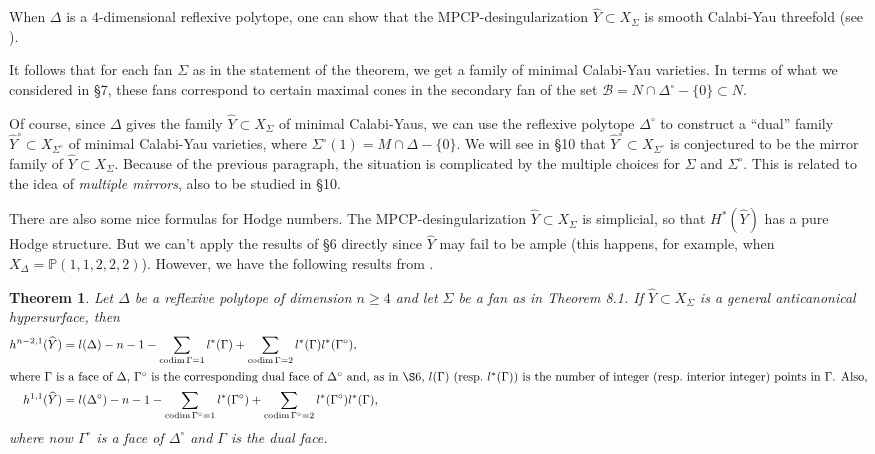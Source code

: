 \documentclass{amsart}
\theoremstyle{plain}
\newtheorem{theorem}{Theorem}[section]
\theoremstyle{definition}
\begin{document}
	When $\Delta$ is a $4$-dimensional reflexive polytope, one can
show that the MPCP-desingularization $\widehat Y \subset X_\Sigma$ is
smooth Calabi-Yau threefold (see \cite{Bat1}).

	It follows that for each fan $\Sigma$ as in the statement of
the theorem, we get a family of minimal Calabi-Yau varieties.  In
terms of what we considered in \S7, these fans correspond to certain
maximal cones in the secondary fan of the set $\mathcal{B} =
N\cap\Delta^\circ-\{0\} \subset N$.  

	Of course, since $\Delta$ gives the family $\widehat Y
\subset X_\Sigma$ of minimal Calabi-Yaus, we can use the reflexive
polytope $\Delta^\circ$ to construct a ``dual'' family $\widehat
Y^\circ \subset X_{\Sigma^\circ}$ of minimal Calabi-Yau varieties,
where $\Sigma^\circ(1) = M\cap\Delta-\{0\}$.  We will see in \S10 that
$\widehat Y^\circ \subset X_{\Sigma^\circ}$ is conjectured to be the
mirror family of $\widehat Y \subset X_\Sigma$.  Because of the
previous paragraph, the situation is complicated by the multiple
choices for $\Sigma$ and $\Sigma^\circ$.  This is related to the idea
of {\it multiple mirrors\/}, also to be studied in \S10.

	There are also some nice formulas for Hodge numbers.  The
MPCP-desingular\-iza\-tion $\widehat Y \subset X_\Sigma$ is
simplicial, so that $H^*(\widehat Y)$ has a pure Hodge structure.  But
we can't apply the results of \S6 directly since $\widehat Y$ may fail
to be ample (this happens, for example, when $X_\Delta = \mathbb{P}(1,1,2,2,2)$).  However, we have the following results from
\cite{Bat1}.

\begin{theorem} Let $\Delta$ be a reflexive polytope of
dimension $n \ge 4$ and let $\Sigma$ be a fan as in Theorem 8.1.  If
$\widehat Y \subset X_\Sigma$ is a general anticanonical hypersurface,
then
\begin{align*}
h^{n-2,1}(\widehat Y) &= l(\Delta) - n - 1 -
   \sum_{\mathrm{codim}\,\Gamma = 1} l^*(\Gamma) +  
   \sum_{\mathrm{codim}\,\Gamma = 2} l^*(\Gamma) l^*(\Gamma^\circ),\\
\intertext{where $\Gamma$ is a face of $\Delta$, $\Gamma^\circ$ is the
corresponding dual face of $\Delta^\circ$ and, as in \S6, $l(\Gamma)$
(resp.\ $l^*(\Gamma)$) is the number of integer (resp.\ interior
integer) points in $\Gamma$.  Also,}
h^{1,1}(\widehat Y) &= l(\Delta^\circ) - n - 1 -
\sum_{\mathrm{codim}\,\Gamma^\circ = 1} l^*(\Gamma^\circ) +  
\sum_{\mathrm{codim}\,\Gamma^\circ = 2} l^*(\Gamma^\circ) l^*(\Gamma),
\end{align*}
where now $\Gamma^\circ$ is a face of $\Delta^\circ$ and $\Gamma$ is
the dual face.
\end{theorem}
\end{document}
